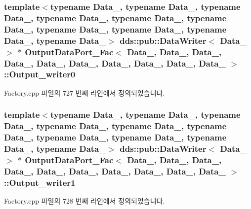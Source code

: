 \subsubsection[{\texorpdfstring{Output\+\_\+writer0}{Output_writer0}}]{\setlength{\rightskip}{0pt plus 5cm}template$<$typename Data\+\_, typename Data\+\_, typename Data\+\_, typename Data\+\_, typename Data\+\_, typename Data\+\_, typename Data\+\_, typename Data\+\_, typename Data\+\_, typename Data\+\_$>$ dds\+::pub\+::\+Data\+Writer$<$ Data\+\_ $>$ $\ast$ {\bf Output\+Data\+Port\+\_\+\+Fac}$<$ Data\+\_, Data\+\_, Data\+\_, Data\+\_, Data\+\_, Data\+\_, Data\+\_, Data\+\_, Data\+\_, Data\+\_ $>$\+::Output\+\_\+writer0}\hypertarget{classOutputDataPort__Fac_a56a9a1580ad01a693130fe625241117e}{}\label{classOutputDataPort__Fac_a56a9a1580ad01a693130fe625241117e}


Factory.\+cpp 파일의 727 번째 라인에서 정의되었습니다.

\subsubsection[{\texorpdfstring{Output\+\_\+writer1}{Output_writer1}}]{\setlength{\rightskip}{0pt plus 5cm}template$<$typename Data\+\_, typename Data\+\_, typename Data\+\_, typename Data\+\_, typename Data\+\_, typename Data\+\_, typename Data\+\_, typename Data\+\_, typename Data\+\_, typename Data\+\_$>$ dds\+::pub\+::\+Data\+Writer$<$ Data\+\_ $>$ $\ast$ {\bf Output\+Data\+Port\+\_\+\+Fac}$<$ Data\+\_, Data\+\_, Data\+\_, Data\+\_, Data\+\_, Data\+\_, Data\+\_, Data\+\_, Data\+\_, Data\+\_ $>$\+::Output\+\_\+writer1}\hypertarget{classOutputDataPort__Fac_aed0b1cc297325160080bd8e419b56af5}{}\label{classOutputDataPort__Fac_aed0b1cc297325160080bd8e419b56af5}


Factory.\+cpp 파일의 728 번째 라인에서 정의되었습니다.

